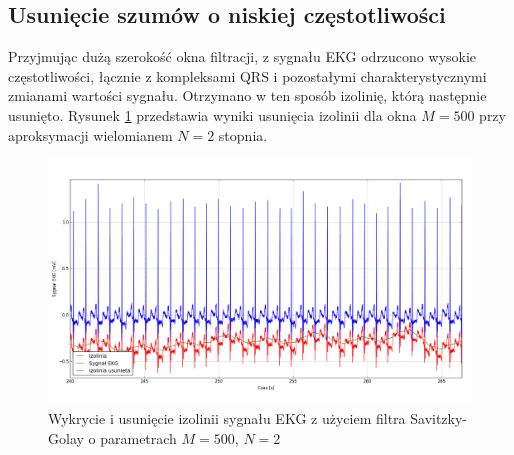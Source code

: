 \subsection{Usunięcie szumów o niskiej częstotliwości}

Przyjmując dużą szerokość okna filtracji, z sygnału EKG odrzucono wysokie częstotliwości, łącznie z kompleksami QRS i pozostałymi charakterystycznymi zmianami wartości sygnału. Otrzymano w ten sposób izolinię, którą następnie usunięto. Rysunek \ref{rys:remove} przedstawia wyniki usunięcia izolinii dla okna $M=500$ przy aproksymacji wielomianem $N=2$ stopnia.

\begin{figure}[!htb]
  \begin{center}
    \includegraphics[scale=0.4]
    {img/remove_baseline1.png}
  \end{center}
  \caption{Wykrycie i usunięcie izolinii sygnału EKG z użyciem filtra Savitzky-Golay o parametrach $M=500$, $N=2$}
  \label{rys:remove}
\end{figure}
